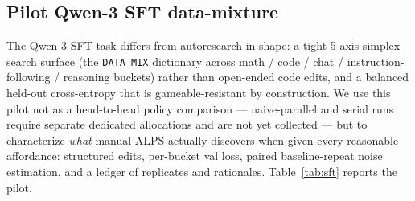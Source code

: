 \documentclass{article}
\newcommand{\alps}{ALPS\xspace}
\newenvironment{addedblock}{\par\color{blue}}{\par}
\begin{document}
\begin{addedblock}
\subsection{Pilot Qwen-3 SFT data-mixture}
\label{sec:experiments:sft}

The Qwen-3 SFT task differs from autoresearch in shape: a tight 5-axis simplex search surface (the \texttt{DATA\_MIX} dictionary across math / code / chat / instruction-following / reasoning buckets) rather than open-ended code edits, and a balanced held-out cross-entropy that is gameable-resistant by construction. We use this pilot not as a head-to-head policy comparison --- naive-parallel and serial runs require separate dedicated allocations and are not yet collected --- but to characterize \emph{what} manual \alps actually discovers when given every reasonable affordance: structured edits, per-bucket val loss, paired baseline-repeat noise estimation, and a ledger of replicates and rationales. Table~\ref{tab:sft} reports the pilot.


\end{addedblock}
\end{document}
